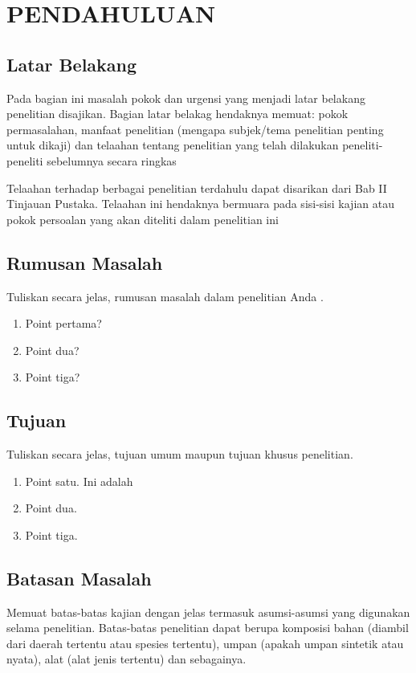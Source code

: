 \chapter{PENDAHULUAN}
\section{Latar Belakang}
Pada bagian ini masalah pokok dan urgensi yang menjadi latar belakang penelitian disajikan. Bagian latar belakag hendaknya memuat: pokok permasalahan, manfaat penelitian (mengapa subjek/tema penelitian penting untuk dikaji) dan telaahan tentang penelitian yang telah dilakukan peneliti-peneliti sebelumnya secara ringkas \cite{muthiahPerformanceEvaluationHadoopa}

Telaahan terhadap berbagai penelitian terdahulu dapat disarikan dari Bab II Tinjauan Pustaka. Telaahan ini hendaknya bermuara pada sisi-sisi kajian atau pokok persoalan yang akan diteliti dalam penelitian ini \cite{ahnPerformanceStudySpark2018}

\section{Rumusan Masalah}
Tuliskan secara jelas, rumusan masalah dalam penelitian Anda \cite{samadiPerformanceComparisonHadoop2018} .
\begin{enumerate}{\tiny }
	\item 
	Point pertama?
	\item
	Point dua?
	\item
	Point tiga?
\end{enumerate}
\section{Tujuan}
Tuliskan secara jelas, tujuan umum maupun tujuan khusus penelitian. 
\begin{enumerate}
	\item 
	Point satu. Ini adalah \cite{KOMPARASIKECEPATANHADOOP}
	\item
	Point dua.
	\item
	Point tiga.
\end{enumerate}
\section{Batasan Masalah}
Memuat batas-batas kajian dengan jelas termasuk asumsi-asumsi yang digunakan selama penelitian. Batas-batas penelitian dapat berupa komposisi bahan (diambil dari daerah tertentu atau spesies tertentu), umpan (apakah umpan sintetik atau nyata), alat (alat jenis tertentu) dan sebagainya.